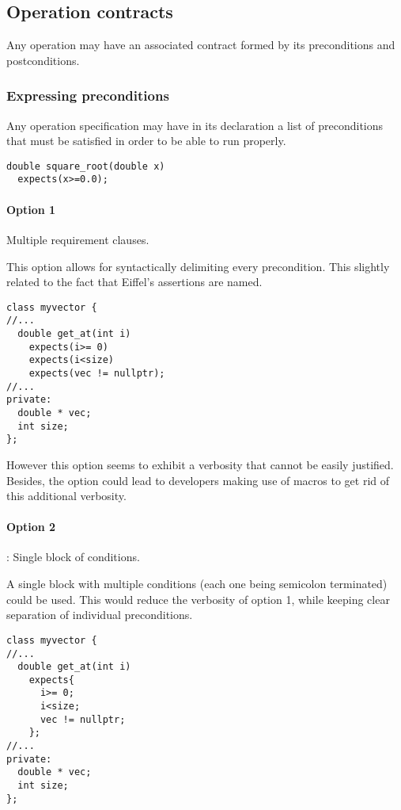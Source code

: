 \subsection{Operation contracts}

Any operation may have an associated contract formed by its preconditions and
postconditions.

\subsubsection{Expressing preconditions}

Any operation specification may have in its declaration a list of preconditions
that must be satisfied in order to be able to run properly.

\begin{lstlisting}
double square_root(double x)
  expects(x>=0.0);
\end{lstlisting}


\paragraph{Option 1} Multiple requirement clauses.

This option allows for syntactically delimiting every precondition. This
slightly related to the fact that Eiffel's assertions are named.

\begin{lstlisting}
class myvector {
//...
  double get_at(int i)
    expects(i>= 0)
    expects(i<size)
    expects(vec != nullptr);
//...
private:
  double * vec;
  int size;
};
\end{lstlisting}

However this option seems to exhibit a verbosity that cannot be easily
justified. Besides, the option could lead to developers making use of macros to
get rid of this additional verbosity.

\paragraph{Option 2}: Single block of conditions.

A single block with multiple conditions (each one being semicolon terminated)
could be used. This would reduce the verbosity of option 1, while keeping clear
separation of individual preconditions.


\begin{lstlisting}
class myvector {
//...
  double get_at(int i)
    expects{
      i>= 0;
      i<size;
      vec != nullptr;
    };
//...
private:
  double * vec;
  int size;
};
\end{lstlisting}

